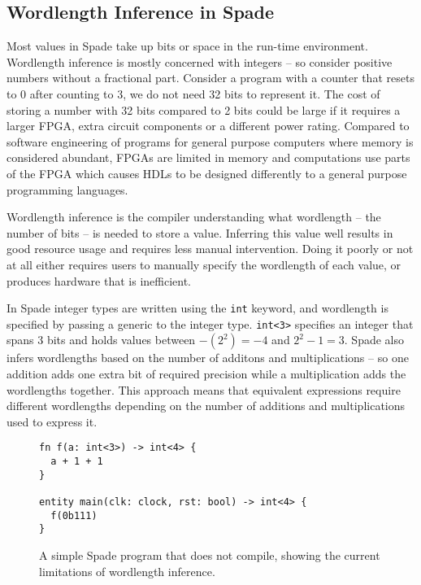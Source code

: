 \subsection{Wordlength Inference in Spade}
\label{sec:TheProblem}
Most values in Spade take up bits or space in the run-time environment. Wordlength inference is mostly concerned with integers -- so consider positive numbers without a fractional part. Consider a program with a counter that resets to 0 after counting to 3, we do not need 32 bits to represent it. The cost of storing a number with 32 bits compared to 2 bits could be large if it requires a larger FPGA, extra circuit components or a different power rating. Compared to software engineering of programs for general purpose computers where memory is considered abundant, FPGAs are limited in memory and computations use parts of the FPGA which causes HDLs to be designed differently to a general purpose programming languages.

Wordlength inference is the compiler understanding what wordlength -- the number of bits -- is needed to store a value. Inferring this value well results in  good resource usage and requires less manual intervention. Doing it poorly or not at all either requires users to manually specify the wordlength of each value, or produces hardware that is inefficient.

In Spade integer types are written using the \verb|int| keyword, and wordlength is specified by passing a generic to the integer type. \verb|int<3>| specifies an integer that spans 3 bits and holds values between $-(2^2) = -4$ and $2^2 - 1 = 3$. Spade also infers wordlengths based on the number of additons and multiplications -- so one addition adds one extra bit of required precision while a multiplication adds the wordlengths together. This approach means that equivalent expressions require different wordlengths depending on the number of additions and multiplications used to express it. 

\begin{figure}[h!]
\centering
\begin{verbatim}
fn f(a: int<3>) -> int<4> {
  a + 1 + 1
}

entity main(clk: clock, rst: bool) -> int<4> {
  f(0b111)
}
\end{verbatim}
\caption{A simple Spade program that does not compile, showing the current limitations of wordlength inference.}
\label{figSimpleFaultSpade}
\end{figure}


